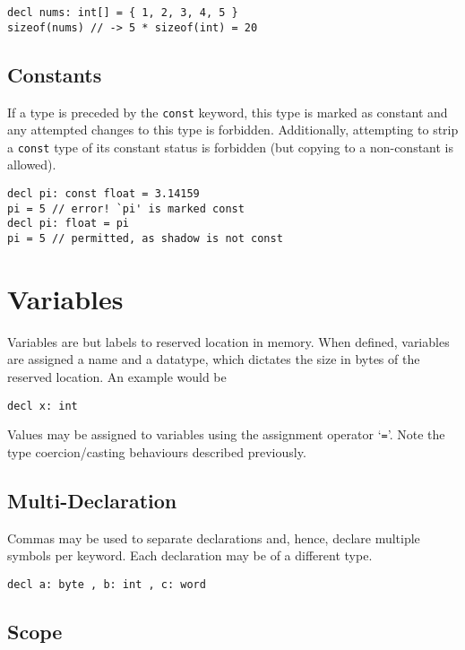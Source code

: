 \documentclass{article}
\begin{document}
\begin{lstlisting}[language=CustomLang]
decl nums: int[] = { 1, 2, 3, 4, 5 }
sizeof(nums) // -> 5 * sizeof(int) = 20
\end{lstlisting}

\subsection{Constants}

If a type is preceded by the \texttt{const} keyword, this type is marked as constant and any attempted changes to this type is forbidden.
Additionally, attempting to strip a \texttt{const} type of its constant status is forbidden (but copying to a non-constant is allowed).

\begin{lstlisting}[language=CustomLang]
decl pi: const float = 3.14159
pi = 5 // error! `pi' is marked const
decl pi: float = pi
pi = 5 // permitted, as shadow is not const
\end{lstlisting}

\section{Variables}

Variables are but labels to reserved location in memory.
When defined, variables are assigned a name and a datatype, which dictates the size in bytes of the reserved location.
An example would be

\begin{lstlisting}[language=CustomLang]
decl x: int
\end{lstlisting}

Values may be assigned to variables using the assignment operator `\texttt{=}'.
Note the type coercion/casting behaviours described previously.

\subsection{Multi-Declaration}

Commas may be used to separate declarations and, hence, declare multiple symbols per keyword.
Each declaration may be of a different type.

\begin{lstlisting}[language=CustomLang]
decl a: byte , b: int , c: word
\end{lstlisting}

\subsection{Scope}
\end{document}
